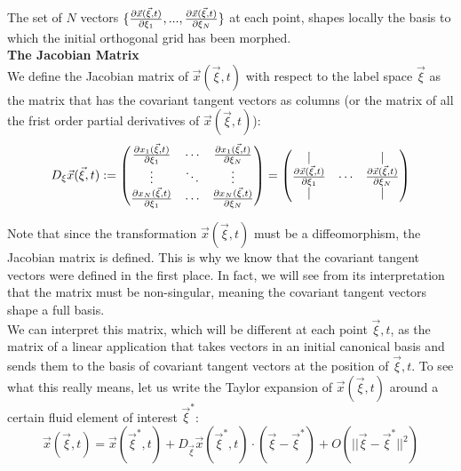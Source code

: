 \documentclass[11pt, a4paper]{article} %
\begin{document}
{The set of $N$ vectors $\{\pdv{\vec{x}(\vec{\xi},t)}{\xi_1},...,\pdv{\vec{x}(\vec{\xi},t)}{\xi_N} \}$ at each point, shapes locally the basis to which the initial orthogonal grid has been morphed.\\

{\bf The Jacobian Matrix\vspace{0.2cm}\\}
We define the Jacobian matrix of $\vec{x}(\vec{\xi},t)$ with respect to the label space $\vec{\xi}$ as the matrix that has the covariant tangent vectors as columns (or the matrix of all the frist order partial derivatives of $\vec{x}(\vec{\xi},t)$):
\begin{equation}
D_\xi\vec{x}(\vec{\xi},t):=\begin{pmatrix}
\pdv{x_1(\vec{\xi},t)}{\xi_1} & \cdots & \pdv{x_1(\vec{\xi},t)}{\xi_N}\\
\vdots&\ddots&\vdots \\
\pdv{x_N(\vec{\xi},t)}{\xi_1} & \cdots & \pdv{x_N(\vec{\xi},t)}{\xi_N}
\end{pmatrix}=\begin{pmatrix}
|& &|\\
\pdv{\vec{x}(\vec{\xi},t)}{\xi_1} & \cdots & \pdv{\vec{x}(\vec{\xi},t)}{\xi_N}\\
|& &|
\end{pmatrix}
\end{equation}

Note that since the transformation $\vec{x}(\vec{\xi},t)$ must be a diffeomorphism, the Jacobian matrix is defined. This is why we know that the covariant tangent vectors were defined in the first place. In fact, we will see from its interpretation that the matrix must be non-singular, meaning the covariant tangent vectors shape a full basis.\\

We can interpret this matrix, which will be different at each point $\vec{\xi},t$, as the matrix of a linear application that takes vectors in an initial canonical basis and sends them to the basis of covariant tangent vectors at the position of $\vec{\xi},t$. To see what this really means, let us write the Taylor expansion of $\vec{x}(\vec{\xi},t)$ around a certain fluid element of interest $\vec{\xi}^*$:
\begin{equation}
\vec{x}(\vec{\xi},t)=\vec{x}(\vec{\xi}^*,t)+D_{\vec{\xi}}\vec{x}(\vec{\xi}^*,t)\cdot (\vec{\xi}-\vec{\xi}^*)+O(||\vec{\xi}-\vec{\xi}^*||^2)
\end{equation}}
\end{document}
